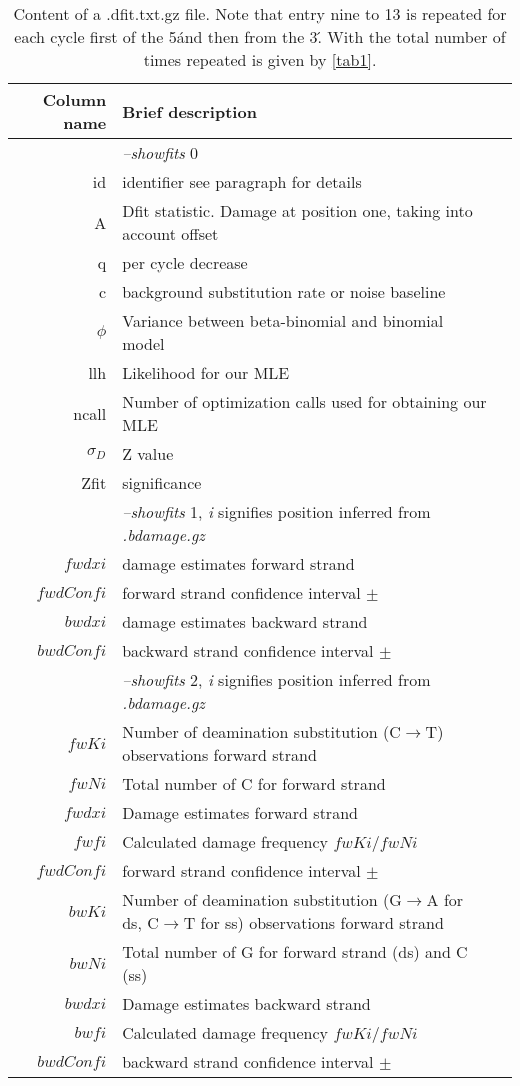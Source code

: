 \documentclass[10pt]{article}
\begin{document}
\begin{table}[h]
\begin{tabular}{rll}
  \hline
  {\bf Column name} & {\bf Brief description} \\
  \hline
  {\sf } & \textit{--showfits} 0 \\ \hline  
  {\sf id} & identifier see paragraph for details\\
  {\sf A} & Dfit statistic. Damage at position one, taking into account offset\\
  {\sf q} & per cycle decrease\\
  {\sf c} & background substitution rate or noise baseline\\ 
  {\sf $\phi$} & Variance between beta-binomial and binomial model\\
  {\sf llh} & Likelihood for our MLE\\
  {\sf ncall} & Number of optimization calls used for obtaining our MLE\\
  {\sf $\sigma_D$} & Z value\\
  {\sf Zfit} & significance\\\hline 
  {\sf } & \textit{--showfits} 1, \textit{i} signifies position inferred from \textit{.bdamage.gz}\\ \hline  
  {\sf $fwdxi$} & damage estimates forward strand \\
  {\sf $fwdConfi$} & forward strand confidence interval $\pm$\\
  {\sf $bwdxi$} & damage estimates backward strand\\
  {\sf $bwdConfi$} & backward strand confidence interval $\pm$\\ \hline
  {\sf } & \textit{--showfits} 2, \textit{i} signifies position inferred from \textit{.bdamage.gz} \\ \hline  
  {\sf $fwKi$} & Number of deamination substitution (C$\rightarrow$T) observations forward strand \\
  {\sf $fwNi$} & Total number of  C for forward strand\\
  {\sf $fwdxi$} & Damage estimates forward strand \\
  {\sf $fwfi$} & Calculated damage frequency $fwKi$/$fwNi$\\
  {\sf $fwdConfi$} & forward strand confidence interval $\pm$\\
  {\sf $bwKi$} & Number of deamination substitution (G$\rightarrow$A for ds, C$\rightarrow$T for ss) observations forward strand \\
  {\sf $bwNi$} & Total number of G for forward strand (ds) and C (ss)\\
  {\sf $bwdxi$} & Damage estimates backward strand \\
  {\sf $bwfi$} & Calculated damage frequency $fwKi$/$fwNi$\\
  {\sf $bwdConfi$} & backward strand confidence interval $\pm$\\ \hline
\end{tabular}\label{tab3}
\caption{Content of a .dfit.txt.gz file. Note that entry nine to 13 is
  repeated for each cycle first of the 5\' and then from the 3\'. With
  the total number of times repeated is given by \ref{tab1}.} 
\end{table}
\end{document}
